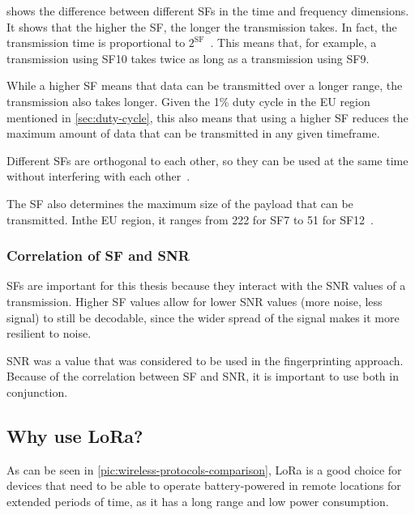  shows the difference between different \aclp{SF} in the time and frequency dimensions.
It shows that the higher the \ac{SF}, the longer the transmission takes.
In fact, the transmission time is proportional to $2^{\text{SF}}$~\cite{sakshama_ghoslya_lora_2017}.
This means that, for example, a transmission using \ac{SF}10 takes twice as long as a transmission using \ac{SF}9.

While a higher \acl{SF} means that data can be transmitted over a longer range, the transmission also takes longer.
Given the 1\% duty cycle in the \ac{EU} region mentioned in \cref{sec:duty-cycle}, this also means that using a higher \acl{SF} reduces the maximum amount of data that can be transmitted in any given timeframe.

Different \aclp{SF} are orthogonal to each other, so they can be used at the same time without interfering with each other~\cite{the_things_network_spreading_2023}.

The \ac{SF} also determines the maximum size of the payload that can be transmitted.
Inthe \ac{EU} region, it ranges from \SI{222}{\byte} for \ac{SF}7 to \SI{51}{\byte} for \ac{SF}12~\cite[p. 10f]{lora_alliance_inc_lorawan_regional_2017}.

\subsubsection{Correlation of \acs{SF} and \acs{SNR}}\label{sec:sf-snr-correlation}

\aclp{SF} are important for this thesis because they interact with the \ac{SNR} values of a transmission.
Higher \acl{SF} values allow for lower \ac{SNR} values (more noise, less signal) to still be decodable, since the wider spread of the signal makes it more resilient to noise.

\ac{SNR} was a value that was considered to be used in the fingerprinting approach.
Because of the correlation between \acl{SF} and \acl{SNR}, it is important to use both in conjunction.

\subsection{Why use \acs{LoRa}?}

As can be seen in \cref{pic:wireless-protocols-comparison}, \ac{LoRa} is a good choice for devices that need to be able to operate battery-powered in remote locations for extended periods of time, as it has a long range and low power consumption.

